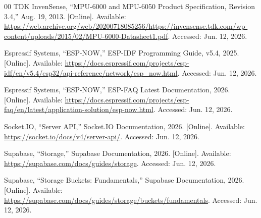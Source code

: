 \documentclass[conference]{IEEEtran}
\begin{document}
\begin{thebibliography}{00}
 TDK InvenSense, ``MPU-6000 and MPU-6050 Product Specification, Revision 3.4,'' Aug. 19, 2013. [Online]. Available: \url{https://web.archive.org/web/20200718085256/https://invensense.tdk.com/wp-content/uploads/2015/02/MPU-6000-Datasheet1.pdf}. Accessed: Jun. 12, 2026.

 Espressif Systems, ``ESP-NOW,'' ESP-IDF Programming Guide, v5.4, 2025. [Online]. Available: \url{https://docs.espressif.com/projects/esp-idf/en/v5.4/esp32/api-reference/network/esp_now.html}. Accessed: Jun. 12, 2026.

 Espressif Systems, ``ESP-NOW,'' ESP-FAQ Latest Documentation, 2026. [Online]. Available: \url{https://docs.espressif.com/projects/esp-faq/en/latest/application-solution/esp-now.html}. Accessed: Jun. 12, 2026.

 Socket.IO, ``Server API,'' Socket.IO Documentation, 2026. [Online]. Available: \url{https://socket.io/docs/v4/server-api/}. Accessed: Jun. 12, 2026.

 Supabase, ``Storage,'' Supabase Documentation, 2026. [Online]. Available: \url{https://supabase.com/docs/guides/storage}. Accessed: Jun. 12, 2026.

 Supabase, ``Storage Buckets: Fundamentals,'' Supabase Documentation, 2026. [Online]. Available: \url{https://supabase.com/docs/guides/storage/buckets/fundamentals}. Accessed: Jun. 12, 2026.
\end{thebibliography}
\end{document}
